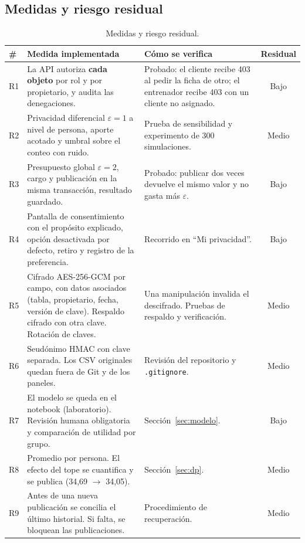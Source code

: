 \documentclass[11pt]{article}
\begin{document}
\subsection{Medidas y riesgo residual}
\begin{table}[H]
\centering\small
\begin{tabularx}{\textwidth}{@{}lYp{4.4cm}c@{}}
\toprule
\textbf{\#} & \textbf{Medida implementada} & \textbf{Cómo se verifica} & \textbf{Residual} \\
\midrule
R1 & La API autoriza \textbf{cada objeto} por rol y por propietario, y audita las denegaciones. & Probado: el cliente recibe 403 al pedir la ficha de otro; el entrenador recibe 403 con un cliente no asignado. & Bajo \\
R2 & Privacidad diferencial $\varepsilon = 1$ a nivel de persona, aporte acotado y umbral sobre el conteo con ruido. & Prueba de sensibilidad y experimento de 300 simulaciones. & Medio \\
R3 & Presupuesto global $\varepsilon = 2$, cargo y publicación en la misma transacción, resultado guardado. & Probado: publicar dos veces devuelve el mismo valor y no gasta más $\varepsilon$. & Bajo \\
R4 & Pantalla de consentimiento con el propósito explicado, opción desactivada por defecto, retiro y registro de la preferencia. & Recorrido en ``Mi privacidad''. & Bajo \\
R5 & Cifrado AES-256-GCM por campo, con datos asociados (tabla, propietario, fecha, versión de clave). Respaldo cifrado con otra clave. Rotación de claves. & Una manipulación invalida el descifrado. Pruebas de respaldo y verificación. & Medio \\
R6 & Seudónimo HMAC con clave separada. Los CSV originales quedan fuera de Git y de los paneles. & Revisión del repositorio y \texttt{.gitignore}. & Medio \\
R7 & El modelo se queda en el notebook (laboratorio). Revisión humana obligatoria y comparación de utilidad por grupo. & Sección~\ref{sec:modelo}. & Bajo \\
R8 & Promedio por persona. El efecto del tope se cuantifica y se publica (34,69 $\rightarrow$ 34,05). & Sección~\ref{sec:dp}. & Medio \\
R9 & Antes de una nueva publicación se concilia el último historial. Si falta, se bloquean las publicaciones. & Procedimiento de recuperación. & Medio \\
\bottomrule
\end{tabularx}
\caption{Medidas y riesgo residual.}
\end{table}
\end{document}
